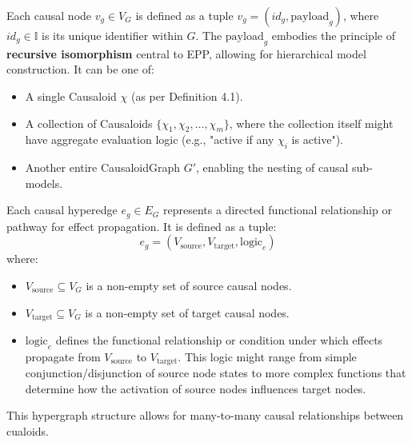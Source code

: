 \begin{definition}
\label{def:causaloid_graph_nodes}
        Each causal node \( v_g \in V_G \) is defined as a tuple \(v_g = (id_g, \text{payload}_g)\), where \(id_g \in \mathbb{I}\) is its unique identifier within \(G\).
        The \( \text{payload}_g \) embodies the principle of \textbf{recursive isomorphism} central to EPP, allowing for hierarchical model construction. It can be one of:
        \begin{itemize}
            \item A single Causaloid \(\chi\) (as per Definition 4.1).
            \item A collection of Causaloids \(\{\chi_1, \chi_2, \dots, \chi_m\}\), where the collection itself might have aggregate evaluation logic (e.g., "active if any \(\chi_i\) is active").
            \item Another entire CausaloidGraph \(G'\), enabling the nesting of causal sub-models.
        \end{itemize}
\end{definition}


\begin{definition}
\label{def:causaloid_graph_edges} 
        Each causal hyperedge \( e_g \in E_G \) represents a directed functional relationship or pathway for effect propagation. It is defined as a tuple:
        \[ e_g = (V_{\text{source}}, V_{\text{target}}, \text{logic}_e) \]
        where:
        \begin{itemize}
            \item \( V_{\text{source}} \subseteq V_G \) is a non-empty set of source causal nodes.
            \item \( V_{\text{target}} \subseteq V_G \) is a non-empty set of target causal nodes.
            \item \( \text{logic}_e \) defines the functional relationship or condition under which effects propagate from \(V_{\text{source}}\) to \(V_{\text{target}}\). This logic might range from simple conjunction/disjunction of source node states to more complex functions that determine how the activation of source nodes influences target nodes.
        \end{itemize}
\end{definition}

This hypergraph structure allows for many-to-many causal relationships between cualoids.\newline

